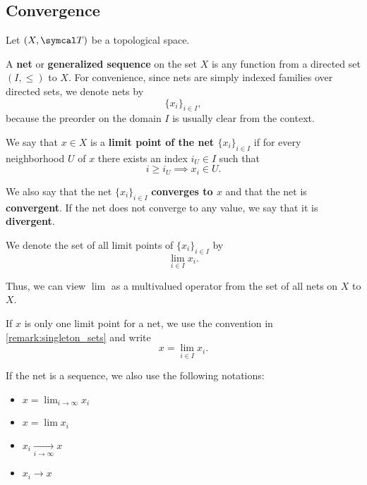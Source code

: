 \subsection{Convergence}\label{subsec:convergence}

Let \( (X, \Cal{T}) \) be a topological space.

\begin{definition}\label{def:topological_net}\cite[49]{Engelking1989}
  A \textbf{net} or \textbf{generalized sequence} on the set \( X \) is any function from a directed set \( (I, \leq) \) to \( X \). For convenience, since nets are simply indexed families over directed sets, we denote nets by
  \begin{equation*}
    \{ x_i \}_{i \in I},
  \end{equation*}
  because the preorder on the domain \( I \) is usually clear from the context.
\end{definition}

\begin{definition}\label{def:net_limit_point}\cite[49]{Engelking1989}
  We say that \( x \in X \) is a \textbf{limit point of the net \( \{ x_i \}_{i \in I} \)} if for every neighborhood \( U \) of \( x \) there exists an index \( i_U \in I \) such that
  \begin{equation*}
    i \geq i_U \implies x_i \in U.
  \end{equation*}

  We also say that the net \( \{ x_i \}_{i \in I} \) \textbf{converges to \( x \)} and that the net is \textbf{convergent}. If the net does not converge to any value, we say that it is \textbf{divergent}.

  We denote the set of all limit points of \( \{ x_i \}_{i \in I} \) by
  \begin{equation*}
    \lim_{i \in I} x_i.
  \end{equation*}

  Thus, we can view \( \lim \) as a multivalued operator from the set of all nets on \( X \) to \( X \).

  If \( x \) is only one limit point for a net, we use the convention in \cref{remark:singleton_sets} and write
  \begin{equation*}
    x = \lim_{i \in I} x_i.
  \end{equation*}

  If the net is a sequence, we also use the following notations:
  \begin{itemize}
    \item \( x = \lim_{i \to \infty} x_i \)
    \item \( x = \lim x_i \)
    \item \( x_i \xrightarrow[i \to \infty]{} x \)
    \item \( x_i \to x \)
  \end{itemize}
\end{definition}

